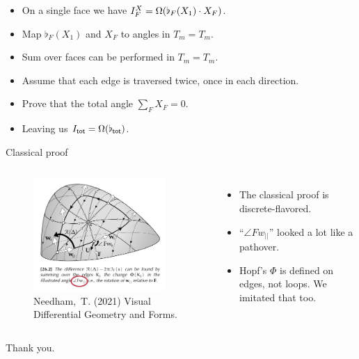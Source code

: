 \documentclass[14pt,aspectratio=169]{beamer}
\renewcommand{\mathrm}[1]{\mathsf{#1}}
\begin{document}
\begin{frame}
\begin{itemize}
\item On a single face we have \( I^X_F=\Omega(\flat_F(X_1)\cdot X_F) \).
\item Map \( \flat_F(X_1) \) and \( X_F \) to angles in \( T_m=T_m \).
\item Sum over faces can be performed in \( T_m=T_m \).
\item Assume that each edge is traversed twice, once in each direction.
\item Prove that the total angle \( \sum_F X_F=0 \).
\item Leaving us \( I_\mathrm{tot}=\loopy(\flat_{\mathrm{tot}}) \).
\end{itemize}
\end{frame}

\begin{frame}{Classical proof}
\begin{columns}
\vspace{12pt}
\begin{figure}
\includegraphics[width=0.9\textwidth]{figs/needham_triangle_circ.pdf}
\caption{{Needham,~T. (2021) Visual Differential Geometry and Forms.}}
\end{figure}
\vspace{-12pt}
\begin{itemize}
\item The classical proof is discrete-flavored.
\item ``\( \angle Fw_{||} \)'' looked a lot like a pathover.
\item Hopf's \( \Phi \) is defined on edges, not loops. We imitated that too.
\end{itemize}
\end{columns}
\end{frame}


\begin{frame}
Thank you.
\end{frame}
\end{document}
